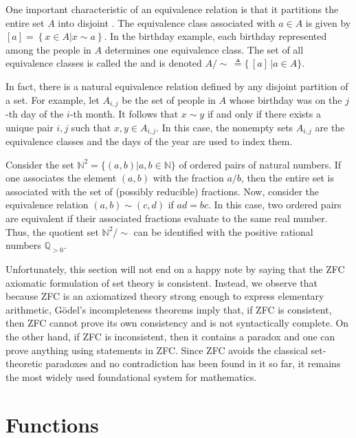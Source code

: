 One important characteristic of an equivalence relation is that it partitions the entire set $A$ into disjoint .
The equivalence class associated with $a\in A$ is given by  $[a] = \left\{x\in A | x \sim a\right\}$.
In the birthday example, each birthday represented among the people in $A$ determines one equivalence class.
The set of all equivalence classes is called the  and is denoted $A / \!\! \sim \, \triangleq \{ \,[a]\, | a\in A \}$.

In fact, there is a natural equivalence relation defined by any disjoint partition of a set.
For example, let $A_{i,j}$ be the set of people in $A$ whose birthday was on the $j$-th day of the $i$-th month.
It follows that $x\sim y$ if and only if there exists a unique pair $i,j$ such that $x,y \in A_{i,j}$.
In this case, the nonempty sets $A_{i,j}$ are the equivalence classes and the days of the year are used to index them.

\begin{example}
Consider the set $\mathbb{N}^2 = \{ (a,b) | a,b\in\mathbb{N} \}$ of ordered pairs of natural numbers.
If one associates the element $(a,b)$ with the fraction $a/b$, then the entire set is associated with the set of (possibly reducible) fractions.
Now, consider the equivalence relation $(a,b) \sim (c,d)$ if $ad=bc$.
In this case, two ordered pairs are equivalent if their associated fractions evaluate to the same real number.
Thus, the quotient set $\mathbb{N}^2 / \!\! \sim$ can be identified with the positive rational numbers $\mathbb{Q}_{>0}$.
\end{example}

Unfortunately, this section will not end on a happy note by saying that the ZFC axiomatic formulation of set theory is consistent.
Instead, we observe that because ZFC is an axiomatized theory strong enough to express elementary arithmetic, G\"odel's incompleteness theorems imply that, if ZFC is consistent, then ZFC cannot prove its own consistency and is not syntactically complete.
On the other hand, if ZFC is inconsistent, then it contains a paradox and one can prove anything using statements in ZFC.
Since ZFC avoids the classical set-theoretic paradoxes and no contradiction has been found in it so far, it remains the most widely used foundational system for mathematics.


\section{Functions}\label{section:Functions}

